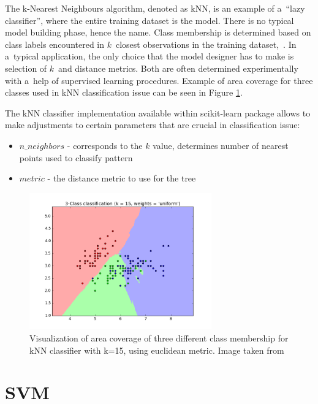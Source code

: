 The k-Nearest Neighbours algorithm, denoted as kNN, is an example of a~``lazy classifier'', where the entire training dataset is the model. There is no typical model building phase, hence the name. Class membership is determined based on class labels encountered in $k$~closest observations in the training dataset,~\cite{Altman1992}. In a~typical application, the only choice that the model designer has to make is selection of $k$~and distance metrics. Both are often determined experimentally with a~help of supervised learning procedures. Example of area coverage for three classes used in kNN classification issue can be seen in Figure \ref{fig:knn_schema}.

The kNN classifier implementation available within scikit-learn package allows to make adjustments to certain parameters that are crucial in classification issue:
\begin{itemize}
	\item $n\_neighbors$ - corresponds to the $k$ value, determines number of nearest points used to classify pattern
	\item $metric$ - the distance metric to use for the tree
\end{itemize}

\begin{figure}[htp]
	\centering
	\includegraphics[width=0.7\textwidth]{Figures/knn_schema.png}
	\caption{Visualization of area coverage of three different class membership for kNN classifier with k=15, using euclidean metric. Image taken from \cite{Scikit-Learn_Website}}
	\label{fig:knn_schema}\vspace{-3pt}
\end{figure}

\section{SVM}


